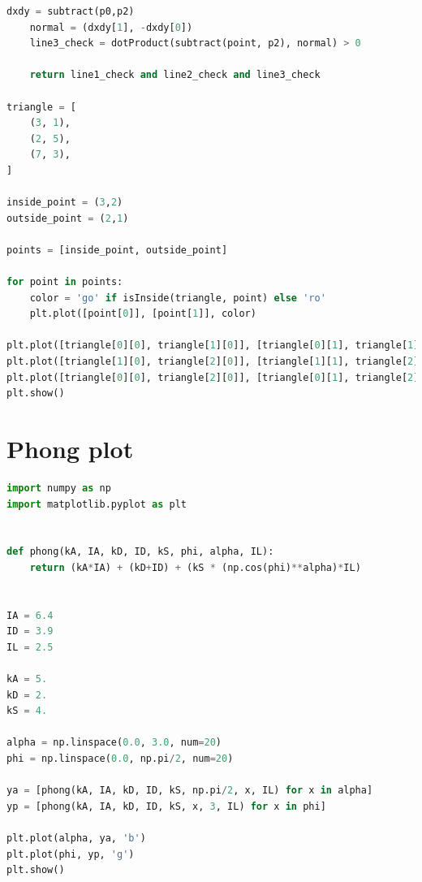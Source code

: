 \documentclass{article}
\begin{document}
\begin{appendices}
\begin{lstlisting}[language=python]
    dxdy = subtract(p0,p2)
    normal = (dxdy[1], -dxdy[0])
    line3_check = dotProduct(subtract(point, p2), normal) > 0

    return line1_check and line2_check and line3_check

triangle = [
    (3, 1),
    (2, 5),
    (7, 3),
]

inside_point = (3,2)
outside_point = (2,1)

points = [inside_point, outside_point]

for point in points:
    color = 'go' if isInside(triangle, point) else 'ro'
    plt.plot([point[0]], [point[1]], color)

plt.plot([triangle[0][0], triangle[1][0]], [triangle[0][1], triangle[1][1]], 'b')
plt.plot([triangle[1][0], triangle[2][0]], [triangle[1][1], triangle[2][1]], 'b')
plt.plot([triangle[0][0], triangle[2][0]], [triangle[0][1], triangle[2][1]], 'b')
plt.show()
        \end{lstlisting}
        \section{Phong plot}
        \label{appendix:pho}
        \begin{lstlisting}[language=python]
import numpy as np
import matplotlib.pyplot as plt


def phong(kA, IA, kD, ID, kS, phi, alpha, IL):
    return (kA*IA) + (kD+ID) + (kS * (np.cos(phi)**alpha)*IL)


IA = 6.4
ID = 3.9
IL = 2.5

kA = 5.
kD = 2.
kS = 4.

alpha = np.linspace(0.0, 3.0, num=20)
phi = np.linspace(0.0, np.pi/2, num=20)

ya = [phong(kA, IA, kD, ID, kS, np.pi/2, x, IL) for x in alpha]
yp = [phong(kA, IA, kD, ID, kS, x, 3, IL) for x in phi]

plt.plot(alpha, ya, 'b')
plt.plot(phi, yp, 'g')
plt.show()

        \end{lstlisting}

    \end{appendices}
\end{document}

